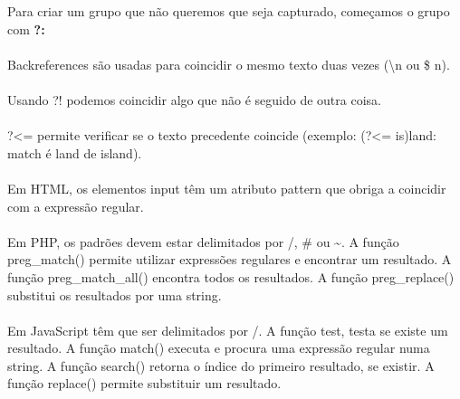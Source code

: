 \documentclass[../resumosLTW.tex]{subfiles}
\begin{document}
Para criar um grupo que não queremos que seja capturado, começamos o grupo com \textbf{?:}

\paragraph{}

Backreferences são usadas para coincidir o mesmo texto duas vezes (\textbackslash n ou \$ n).

\paragraph{} 

Usando ?! podemos coincidir algo que não é seguido de outra coisa.

\paragraph{} 

?<= permite verificar se o texto precedente coincide (exemplo: (?<= is)land: match é land de island).

\paragraph{}

Em HTML, os elementos input têm um atributo pattern que obriga a coincidir com a expressão regular.

\paragraph{}

Em PHP, os padrões devem estar delimitados por /, \# ou \~{}.
A função preg\_match() permite utilizar expressões regulares e encontrar um resultado.
A função preg\_match\_all() encontra todos os resultados.
A função preg\_replace() substitui os resultados por uma string.

\paragraph{}

Em JavaScript têm que ser delimitados por /.
A função test, testa se existe um resultado.
A função match() executa e procura uma expressão regular numa string.
A função search() retorna o índice do primeiro resultado, se existir.
A função replace() permite substituir um resultado.
\end{document}
